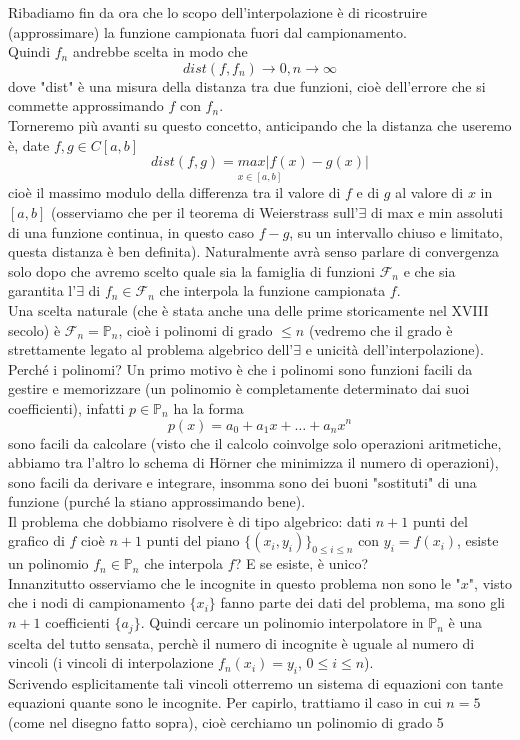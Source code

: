 \documentclass[12pt]{article}
\begin{document}
Ribadiamo fin da ora che lo scopo dell'interpolazione è di ricostruire (approssimare) la funzione campionata fuori dal campionamento.\\
Quindi $f_n$ andrebbe scelta in modo che 
\[
    dist(f,f_n) \to 0, n \to \infty
\]
dove "dist" è una misura della distanza tra due funzioni, cioè dell'errore che si commette approssimando $f$ con $f_n$. \\
Torneremo più avanti su questo concetto, anticipando che la distanza che useremo è, date $f,g \in C[a,b]$
\[
    \underset{x \in [a,b]}{dist(f,g) = max |f(x) - g(x)|}
\]
cioè il massimo modulo della differenza tra il valore di $f$ e di $g$ al valore di $x$ in $[a,b]$ (osserviamo che per il teorema di Weierstrass sull'$\exists$ di max e min assoluti di una funzione continua, in questo caso $f-g$, su un intervallo chiuso e limitato, questa distanza è ben definita). Naturalmente avrà senso parlare di convergenza solo dopo che avremo scelto quale sia la famiglia di funzioni $\mathcal{F}_n$ e che sia garantita l'$\exists$ di $f_n \in \mathcal{F}_n$ che interpola la funzione campionata $f$. \\
Una scelta naturale (che è stata anche una delle prime storicamente nel XVIII secolo) è $\mathcal{F}_n = \mathbb{P}_n$, cioè i polinomi di grado $\leq n$ (vedremo che il grado è strettamente legato al problema algebrico dell'$\exists$ e unicità dell'interpolazione).\\
Perché i polinomi? Un primo motivo è che i polinomi sono funzioni facili da gestire e memorizzare (un polinomio è completamente determinato dai suoi coefficienti), infatti $p \in \mathbb{P}_n$ ha la forma 
\[
    p(x) = a_0 + a_1x + \dotso + a_nx^n
\]
sono facili da calcolare (visto che il calcolo coinvolge solo operazioni aritmetiche, abbiamo tra l'altro lo schema di H{\"o}rner che minimizza il numero di operazioni), sono facili da derivare e integrare, insomma sono dei buoni "sostituti" di una funzione (purché la stiano approssimando bene). \\
Il problema che dobbiamo risolvere è di tipo algebrico: dati $n+1$ punti del grafico di $f$ cioè $n+1$ punti del piano $\{(x_i,y_i)\}_{0\leq i\leq n}$ con $y_i=f(x_i)$, esiste un polinomio $f_n\in\mathbb{P}_n$ che interpola $f$? E se esiste, è unico?\\ Innanzitutto osserviamo che le incognite in questo problema non sono le "$x$", visto che i nodi di campionamento $\{x_i\}$ fanno parte dei dati del problema, ma sono gli $n+1$ coefficienti $\{a_j\}$. Quindi cercare un polinomio interpolatore in $\mathbb{P}_n$ è una scelta del tutto sensata, perchè il numero di incognite è uguale al numero di vincoli (i vincoli di interpolazione $f_n(x_i)=y_i$, $0\leq i\leq n$).\\Scrivendo esplicitamente tali vincoli otterremo un sistema di equazioni con tante equazioni quante sono le incognite. Per capirlo, trattiamo il caso in cui $n=5$ (come nel disegno fatto sopra), cioè cerchiamo un polinomio di grado 5
\end{document}
